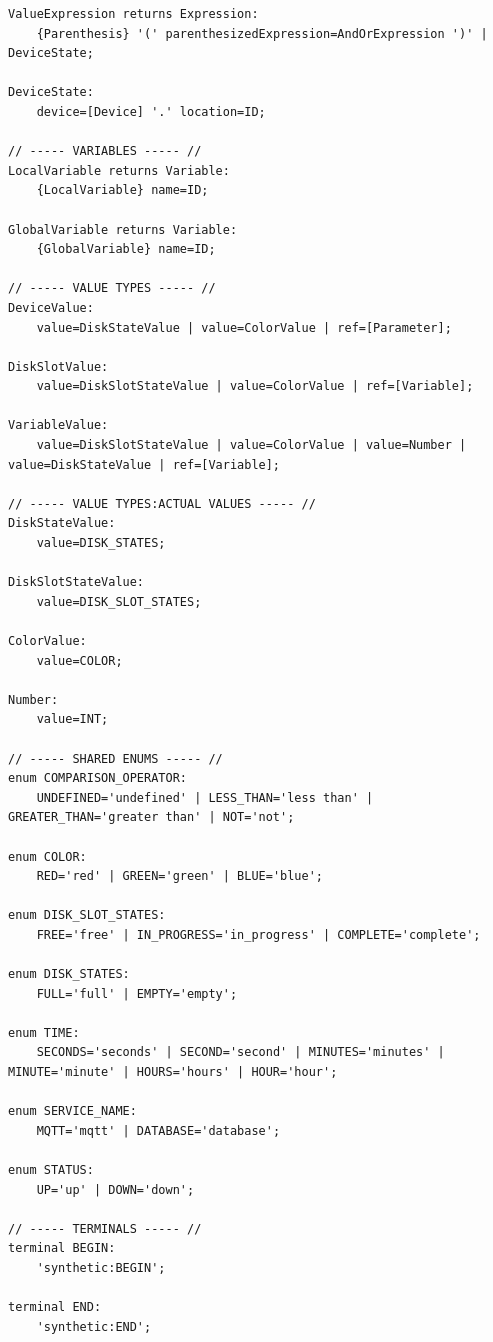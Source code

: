 \begin{verbatim}
ValueExpression returns Expression:
	{Parenthesis} '(' parenthesizedExpression=AndOrExpression ')' | DeviceState;

DeviceState:
	device=[Device] '.' location=ID;

// ----- VARIABLES ----- //
LocalVariable returns Variable:
	{LocalVariable} name=ID;

GlobalVariable returns Variable:
	{GlobalVariable} name=ID;

// ----- VALUE TYPES ----- //
DeviceValue:
	value=DiskStateValue | value=ColorValue | ref=[Parameter];

DiskSlotValue:
	value=DiskSlotStateValue | value=ColorValue | ref=[Variable];

VariableValue:
	value=DiskSlotStateValue | value=ColorValue | value=Number | value=DiskStateValue | ref=[Variable];

// ----- VALUE TYPES:ACTUAL VALUES ----- //
DiskStateValue:
	value=DISK_STATES;

DiskSlotStateValue:
	value=DISK_SLOT_STATES;

ColorValue:
	value=COLOR;

Number:
	value=INT;

// ----- SHARED ENUMS ----- //
enum COMPARISON_OPERATOR:
	UNDEFINED='undefined' | LESS_THAN='less than' | GREATER_THAN='greater than' | NOT='not';

enum COLOR:
	RED='red' | GREEN='green' | BLUE='blue';

enum DISK_SLOT_STATES:
	FREE='free' | IN_PROGRESS='in_progress' | COMPLETE='complete';

enum DISK_STATES:
	FULL='full' | EMPTY='empty';

enum TIME:
	SECONDS='seconds' | SECOND='second' | MINUTES='minutes' | MINUTE='minute' | HOURS='hours' | HOUR='hour';

enum SERVICE_NAME:
	MQTT='mqtt' | DATABASE='database';

enum STATUS:
	UP='up' | DOWN='down';

// ----- TERMINALS ----- //
terminal BEGIN:
	'synthetic:BEGIN';

terminal END:
	'synthetic:END';
\end{verbatim}

